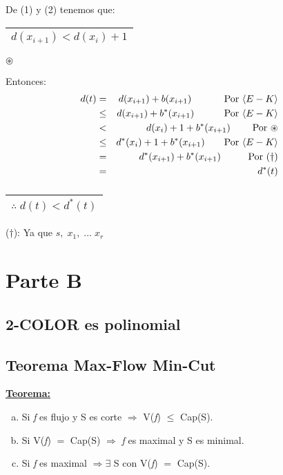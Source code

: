 \documentclass[12pt,a4paper]{report}
\begin{document}
\begin{enumerate}
\begin{enumerate}[a)]
				\vspace{5mm}
				De (1) y (2) tenemos que: \begin{tabular}{|c|} \hline $d(x_{i+1}) < d(x_{i}) +1 $ \\ \hline \end{tabular} $\circledast$

				Entonces:
				\begin{eqnarray}
				\nonumber d(t) & = & d(x_{i+1}) + b(x_{i+1}) \qquad\;\;\;\;\;\textup{Por }\langle E-K \rangle\\
				\nonumber & \leq & d(x_{i+1}) + b^{*}(x_{i+1}) \qquad\;\;\;\;\textup{Por }\langle E-K \rangle\\
				\nonumber & < & d(x_{i}) +1 + b^{*}(x_{i+1}) \qquad\;\textup{Por } \circledast \\
				\nonumber & \leq & d^{*}(x_{i}) + 1 + b^{*}(x_{i+1}) \qquad\textup{Por }\langle E-K \rangle \\
				\nonumber & = & d^{*}(x_{i+1}) + b^{*}(x_{i+1}) \qquad\;\;\;\textup{Por } (\dag) \\
				\nonumber & = & d^{*}(t)
				\end{eqnarray}
				$\qquad\qquad\qquad\;\;\;$
				\begin{tabular}{|c|} \hline $\therefore \; d(t) < d^{*}(t)$ \\ \hline \end{tabular}

				($\dag$): Ya que $s, \; x_{1}, \; \dotsc \; x_{r}$
			\end{enumerate}
		\end{enumerate}



\chapter{Parte B}

	\section{2-COLOR es polinomial}


	\section{Teorema Max-Flow Min-Cut}
		\textbf{\underline{Teorema:}}
		\begin{enumerate}[a)]
			\item Si \textit{f} es flujo y S es corte $\Rightarrow$ V(\textit{f}) $\leq$ Cap(S).
			\item Si V(\textit{f}) $=$ Cap(S) $\Rightarrow$ \textit{f} es maximal y S es minimal.
			\item Si \textit{f} es maximal $\Rightarrow \exists$ S con V(\textit{f}) $=$ Cap(S).
		\end{enumerate}
\end{document}
